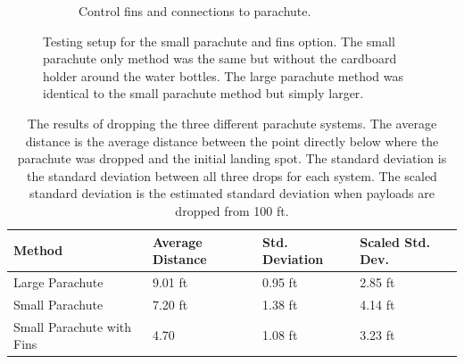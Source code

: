 \documentclass[]{auvsi_doc}
\begin{document}
\begin{figure}[ht]
\begin{subfigure}{0.49\linewidth}
     \caption{Control fins and connections to parachute.}\label{fig:ControlFins}
   \end{subfigure}
\caption{Testing setup for the small parachute and fins option. The small parachute only method was the same but without the cardboard holder around the water bottles. The large parachute method was identical to the small parachute method but simply larger.}
\label{fig:combined}
\end{figure}

\begin{table}[h]
\caption{The results of dropping the three different parachute systems. The average distance is the average distance between the point directly below where the parachute was dropped and the initial landing spot. The standard deviation is the standard deviation between all three drops for each system. The scaled standard deviation is the estimated standard deviation when payloads are dropped from 100 ft. }
\label{table:results}

\begin{tabular}{| l | l | l | l |}
\hline
Method & Average Distance & Std. Deviation & Scaled Std. Dev.\\
\hline
Large Parachute & 9.01 ft  & 0.95 ft & 2.85 ft\\
Small Parachute & 7.20 ft  & 1.38 ft & 4.14 ft\\
Small Parachute with Fins & 4.70  & 1.08 ft & 3.23 ft\\
\hline

\end{tabular}

\end{table}
\end{document}
